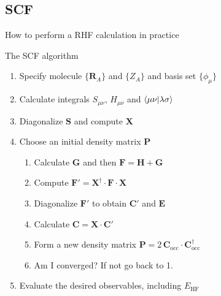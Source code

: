 \documentclass[aspectratio=169,9pt]{beamer}
\newcommand{\EHF}{E_\text{HF}}
\newcommand{\bR}{\boldsymbol{R}}
\newcommand{\bC}{\boldsymbol{C}}
\newcommand{\bE}{\boldsymbol{E}}
\newcommand{\bG}{\boldsymbol{G}}
\newcommand{\bP}{\boldsymbol{P}}
\newcommand{\bS}{\boldsymbol{S}}
\newcommand{\bF}{\boldsymbol{F}}
\newcommand{\bH}{\boldsymbol{H}}
\newcommand{\bX}{\boldsymbol{X}}
\begin{document}
\subsection{SCF}
\begin{frame}{How to perform a RHF calculation in practice}
	\begin{block}{The SCF algorithm}
		\begin{enumerate}
			\item \alert{Specify molecule} $\{\bR_A\}$ and $\{Z_A\}$ and \alert{basis set} $\{\phi_\mu\}$ 
			\item Calculate integrals $S_{\mu \nu}$, $H_{\mu \nu}$ and $\braket{ \mu \nu }{ \lambda \sigma }$
			\item Diagonalize $\bS$ and compute $\bX$
			\item Choose an \alert{initial density matrix} $\bP$
			\begin{enumerate}
				\item[1.] Calculate $\bG$ and then $\bF = \bH + \bG$
				\item[2.] Compute $\bF' = \bX^\dag \cdot \bF \cdot \bX$
				\item[3.] Diagonalize $\bF'$ to obtain $\bC'$ and $\bE$
				\item[4.] Calculate $\bC= \bX \cdot  \bC'$
				\item[5.] Form a \alert{new density matrix} $\bP = 2\,\bC_{\text{occ}} \cdot \bC_{\text{occ}}^\dag$
				\item[6.] \alert{Am I converged?} If not go back to 1.
			\end{enumerate}
			\item Evaluate the desired observables, including $\EHF$
		\end{enumerate}
	\end{block}
\end{frame}
\end{document}
